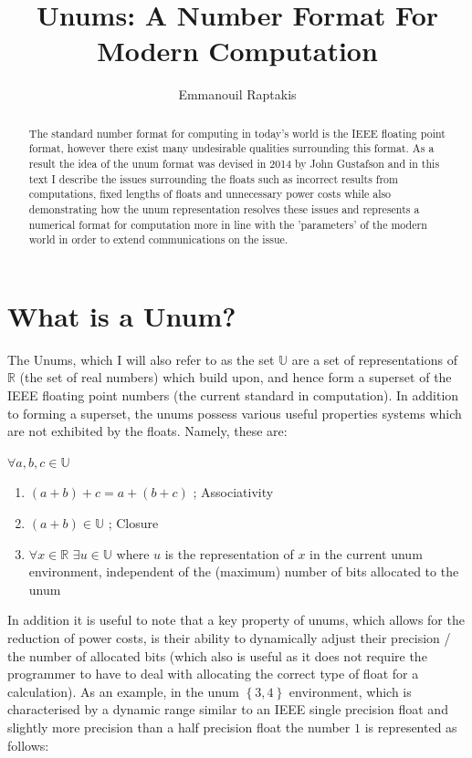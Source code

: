 \documentclass[twocolumn]{IEEEtran}
\begin{document}
\title{Unums: \break A Number Format For Modern Computation}
\author{Emmanouil Raptakis}

\maketitle

\begin{abstract}
The standard number format for computing in today's world is the IEEE floating point format, however there exist many undesirable qualities surrounding this format. As a result the idea of the unum format was devised in 2014 by John Gustafson and in this text I describe the issues surrounding the floats such as incorrect results from computations, fixed lengths of floats and unnecessary power costs while also demonstrating how the unum representation resolves these issues and represents a numerical format for computation more in line with the 'parameters' of the modern world in order to extend communications on the issue.
\end{abstract}

\section{What is a Unum?}
The Unums, which I will also refer to as the set $\mathbb{U}$ are a set of representations of $\mathbb{R}$ (the set of real numbers) which build upon, and hence form a superset of the IEEE floating point numbers (the current standard in computation). In addition to forming a superset, the unums possess various useful properties systems which are not exhibited by the floats. Namely, these are:
\break
\centerline{$\forall a,b,c \in \mathbb{U}$}
\begin{enumerate}
	\item $(a + b) + c = a + (b + c)$ ; Associativity 
	\item $(a + b) \in \mathbb{U}$ ; Closure
	\item $\forall x \in \mathbb{R}$ $ \exists u \in \mathbb{U}$ where $u$ is the representation of $x$ in the current unum  	     	          environment, independent of the (maximum) number of bits allocated to the unum
\end{enumerate}
In addition it is useful to note that a key property of unums, which allows for the reduction of power costs, is their ability to dynamically adjust their precision / the number of allocated bits (which also is useful as it does not require the programmer to have to deal with allocating the correct type of float for a calculation). As an example, in the unum $\left\{3,4\right\}$ environment, which is characterised by a dynamic range similar to an IEEE single precision float and slightly more precision than a half precision float the number $1$ is represented as follows:
\end{document}
